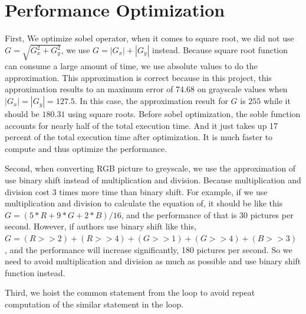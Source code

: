 \documentclass[conference,compsoc]{IEEEtran}
\begin{document}
    
    
    
    
    
    
  \section{Performance Optimization}
  First, We optimize sobel operator, when it comes to square root, we did not use $G = \sqrt{ G_x^2 + G_y^2 } $, we use $G = |G_x| + |G_y| $ instead. Because square root function can consume a large amount of time, we use absolute values to do the approximation. This approximation is correct because in this project, 
  this approximation results to an maximum error of 74.68 on grayscale values when $ |G_x| = |G_y| = 127.5$. In this case, the approximation result for $G$ is $255$ while it should be $180.31$ using square roots. Before sobel optimization, the soble function accounts for nearly half of the total execution time. And it just takes up 17 percent of the total execution time after optimization. It is much faster to compute and thus optimize the performance.
  \par Second, when converting RGB picture to greyscale, we use the approximation of  use binary shift instead of multiplication and division. Because multiplication and division cost 3 times more time than binary shift. For example, if we use multiplication and division to calculate the equation of, it should be like this $G = (5*R + 9*G + 2*B)/16 $, and the performance of that is 30 pictures per second. However, if authors use binary shift like this,$G = (R>>2) + (R>>4) + (G>>1) + (G>>4) + (B>>3) $
  , and the performance will increase significantly, 180 pictures per second. So we need to avoid multiplication and division as much as possible and use binary shift function instead. 
  \par Third, we hoist the common statement from the loop to avoid repeat computation of the similar statement in the loop. 
\end{document}
